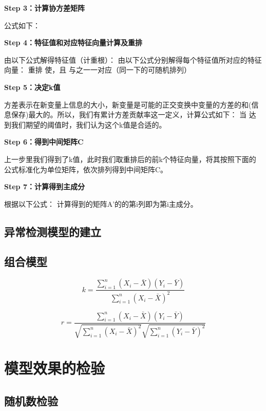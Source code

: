 \documentclass[a4paper]{article}
\begin{document}
\begin{enumerate}[itemindent=1cm,leftmargin=0em,label=(\Roman*)]
		
		
		\textbf{Step 3：计算协方差矩阵}
		
		公式如下：
		
		\textbf{Step 4：特征值和对应特征向量计算及重排}
		
		由以下公式解得特征值（计重根）：
		由以下公式分别解得每个特征值所对应的特征向量：
		重排 使，且 与之一一对应（同一下的可随机排列）
		
		\textbf{Step 5：决定k值}
		
		方差表示在新变量上信息的大小，新变量是可能的正交变换中变量的方差的和(信息保存)最大的。所以，我们有累计方差贡献率这一定义，计算公式如下：
		当 达到我们期望的阈值时，我们认为这个k值是合适的。
		
		\textbf{Step 6：得到中间矩阵C}
		
		上一步里我们得到了k值，此时我们取重排后的前k个特征向量，将其按照下面的公式标准化为单位矩阵，依次排列得到中间矩阵C。
		
		\textbf{Step 7：计算得到主成分}
		
		根据以下公式：
		计算得到的矩阵A’的的第i列即为第i主成分。
		
		
		
	\end{enumerate}
	\subsection{异常检测模型的建立}
	\subsection{组合模型}			
	\begin{equation}  
		k = \frac{\sum_{i=1}^{n} (X_i - \bar{X})(Y_i - \bar{Y})}{\sum_{i=1}^{n} (X_i - \bar{X})^2}  
	\end{equation} 
	
	\begin{equation}
		\label{rr}
		r=\frac{\sum_{i=1}^n\left(X_i-\bar{X}\right)\left(Y_i-\bar{Y}\right)}{\sqrt{\sum_{i=1}^n\left(X_i-\bar{X}\right)^2} \sqrt{\sum_{i=1}^n\left(Y_i-\bar{Y}\right)^2}}
	\end{equation}

	\section{模型效果的检验}
	\subsection{随机数检验}
	
\end{document}
